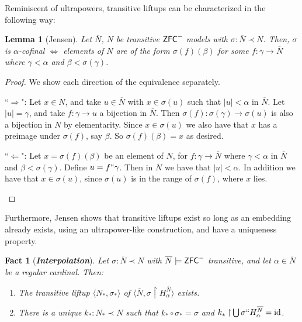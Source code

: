 \documentclass{amsart}
\newtheorem{lemma}[theorem]{Lemma}
\newtheorem{fact}[theorem]{Fact}
\theoremstyle{definition}
\theoremstyle{remark}
\newcommand{\N}{{\overline{N}}}
\newcommand{\ZFC}{\textup{\ensuremath{\textsf{ZFC}}}}
\newcommand{\id}{\textup{\ensuremath{\text{id}}}}
\newcommand{\rest}{\mathbin{\upharpoonright}}
\begin{document}
Reminiscent of ultrapowers, transitive liftups can be characterized in the following way:
\begin{lemma}[Jensen] \label{lemma:liftupchar} Let $\N$, $N$ be transitive $\ZFC^-$ models with $\sigma: \N \prec N$. Then,
$\sigma$ is $\alpha$-cofinal $\iff$ elements of $N$ are of the form $\sigma(f)(\beta)$ for some $f: \gamma \to \overline N$ where $\gamma < \alpha$ and $\beta < \sigma(\gamma)$. \end{lemma} 
\begin{proof} We show each direction of the equivalence separately.
	\begin{paragraph}{``$\Longrightarrow$":} Let $x \in N$, and take $u \in \overline N$ with $x \in \sigma(u)$ such that $|u| <\alpha$ in $\overline N$. Let $|u|=\gamma$, and take $f:\gamma \to u$ a bijection in $\overline N$. Then $\sigma(f):\sigma(\gamma) \to \sigma(u)$ is also a bijection in $N$ by elementarity. Since $x \in \sigma(u)$ we also have that $x$ has a preimage under $\sigma(f)$, say $\beta$. So $\sigma(f)(\beta)=x$ as desired. \end{paragraph}
	\begin{paragraph}{``$\Longleftarrow$":} Let $x=\sigma(f)(\beta)$ be an element of $N$, for $f:\gamma \to \overline N$ where $\gamma < \alpha$ in $\overline N$ and $\beta < \sigma(\gamma)$. Define $u = f``\gamma$. Then in $\overline N$ we have that $|u|<\alpha$. In addition we have that $x \in \sigma(u)$, since $\sigma(u)$ is in the range of $\sigma(f)$, where $x$ lies. \end{paragraph}
\end{proof}

Furthermore, Jensen shows that transitive liftups exist so long as an embedding already exists, using an ultrapower-like construction, and have a uniqueness property.

\begin{fact}[\textbf{\emph{Interpolation}}]\label{fact:Interpolation} Let $\sigma:\N \prec N$ with $\N \models \ZFC^-$ transitive, and let $\alpha \in \N$ be a regular cardinal. Then: \begin{enumerate}
	\item The transitive liftup $\langle N_*, \sigma_* \rangle$ of $\langle \N, \sigma \rest H^{\N}_\alpha \rangle$ exists.
	\item There is a unique $k_*:N_* \prec N$ such that $k_* \circ \sigma_* = \sigma$ and $k_* \rest \bigcup \sigma `` H^{\N}_\alpha = \id$.
\end{enumerate}
\end{fact} 
\end{document}
